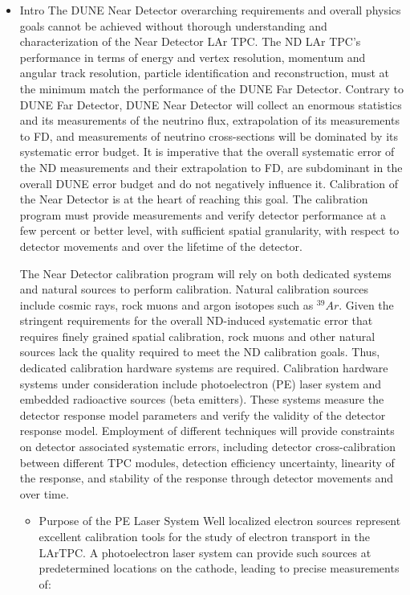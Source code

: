 \begin{itemize}
    \item Intro 
The DUNE Near Detector overarching requirements and overall physics goals cannot be achieved without thorough understanding and characterization of the Near Detector LAr TPC. The ND LAr TPC’s performance in terms of energy and vertex resolution, momentum and angular track resolution, particle identification and reconstruction, must at the minimum match the performance of the DUNE Far Detector. Contrary to DUNE Far Detector, DUNE Near Detector will collect an enormous statistics and its measurements of the neutrino flux, extrapolation of its measurements to FD, and measurements of neutrino cross-sections will be dominated by its systematic error budget. It is imperative that the overall systematic error of the ND measurements and their extrapolation to FD, are subdominant in the overall DUNE error budget and do not negatively influence it. Calibration of the Near Detector is at the heart of reaching  this goal. The calibration program must provide measurements and verify detector performance at a few percent or better level, with sufficient spatial granularity, with respect to detector movements and over the lifetime of the detector. 

The Near Detector calibration program will rely on both dedicated systems and natural sources to perform calibration. Natural calibration sources include cosmic rays, rock muons and argon isotopes such as $^{39}Ar$. Given the stringent requirements for the overall ND-induced systematic error that requires finely grained spatial calibration, rock muons and other natural sources lack the quality required to meet the ND calibration goals. Thus, dedicated calibration hardware systems are required.  Calibration hardware systems under consideration include photoelectron (PE) laser system and embedded radioactive sources (beta emitters). These systems measure the detector response model parameters and verify the validity of the detector response model. Employment of different techniques will provide constraints on detector associated systematic errors, including detector cross-calibration between different TPC modules, detection efficiency uncertainty, linearity of the response, and stability of the response through detector movements and over time.

    \begin{itemize}
        \item Purpose of the PE Laser System
        Well localized electron sources represent excellent calibration tools for the study of electron transport in the LArTPC. A photoelectron laser system can provide such sources at predetermined locations on the cathode, leading to precise measurements of:
        

\end{itemize}
\end{itemize}
